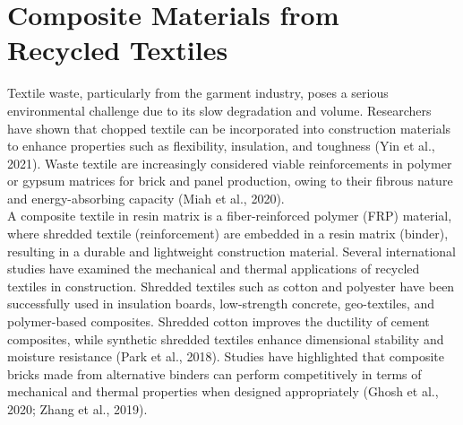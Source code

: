 \section{Composite Materials from Recycled Textiles }

Textile waste, particularly from the garment industry, poses a serious environmental challenge due to its slow degradation and volume. Researchers have shown that chopped textile can be incorporated into construction materials to enhance properties such as flexibility, insulation, and toughness (Yin et al., 2021). Waste textile are increasingly considered viable reinforcements in polymer or gypsum matrices for brick and panel production, owing to their fibrous nature and energy-absorbing capacity (Miah et al., 2020). \\

\noindent A composite textile in resin matrix is a fiber-reinforced polymer (FRP) material, where shredded textile (reinforcement) are embedded in a resin matrix (binder), resulting in a durable and lightweight construction material. Several international studies have examined the mechanical and thermal applications of recycled textiles in construction. Shredded textiles such as cotton and polyester have been successfully used in insulation boards, low-strength concrete, geo-textiles, and polymer-based composites. Shredded cotton improves the ductility of cement composites, while synthetic shredded textiles enhance dimensional stability and moisture resistance (Park et al., 2018). Studies have highlighted that composite bricks made from alternative binders can perform competitively in terms of mechanical and thermal properties when designed appropriately (Ghosh et al., 2020; Zhang et al., 2019). 